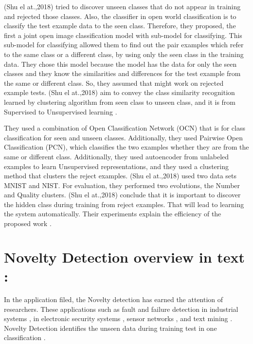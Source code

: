 \documentclass[conference]{IEEEtran}
\begin{document}
\par (Shu el at.,2018) tried to discover unseen classes that do not appear in training and rejected those classes. Also, the classifier in open world classification is to classify the test example data to the seen class. Therefore, they proposed, the first a joint open image classification model with sub-model for classifying. This sub-model for classifying allowed them to find out the pair examples which refer to the same class or a different class, by using only the seen class in the training data. They chose this model because the model has the data for only the seen classes and they know the similarities and differences for the test example from the same or different class. So, they assumed that might work on rejected example tests. (Shu el at.,2018) aim to convey the class similarity recognition learned by clustering algorithm from seen class to unseen class, and it is from Supervised to Unsupervised learning \cite{shu2018unseen} \cite{pan2010survey}.  



\per They used a combination of Open Classification Network (OCN) that is for class classification for seen and unseen classes. Additionally, they used Pairwise Open Classification (PCN), which classifies the two examples whether they are from the same or different class. Additionally, they used autoencoder from unlabeled examples to learn Unsupervised representations, and they used a clustering method that clusters the reject examples. (Shu el at.,2018) used two data sets MNIST and NIST. For evaluation, they performed two evolutions, the Number and Quality clusters. (Shu el at.,2018) conclude that it is important to discover the hidden class during training from reject examples. That will lead to learning the system automatically. Their experiments explain the efficiency of the proposed work \cite{shu2018unseen}.





\section {Novelty Detection overview in text :}



In the application filed, the Novelty detection has earned the attention of researchers. These applications such as fault and failure detection in industrial systems \cite{tarassenko2009novelty}, in electronic security systems \cite{patcha2007overview} \cite{jyothsna2011review}, sensor networks \cite{zhang2010outlier}, and text mining \cite{kulis2009semi}. Novelty Detection identifies the unseen data during training test in one classification \cite{moya1993one}. 
\end{document}
